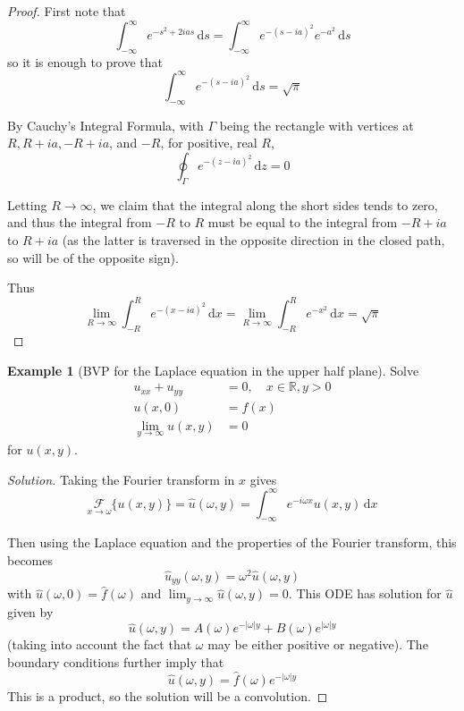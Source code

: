 \documentclass[10pt,fleqn]{article}
\newcommand{\diff}{\,\mathrm{d}}
\newcommand{\reals}{\mathbb{R}}
\theoremstyle{definition} \newtheorem{defn}{Definition}[section]
\theoremstyle{plain}      \newtheorem{thm}[defn]{Theorem}
\theoremstyle{plain}      \newtheorem{lem}[defn]{Lemma}
\theoremstyle{definition} \newtheorem{prop}[defn]{Proposition}
\theoremstyle{definition} \newtheorem{cor}[defn]{Corollary}
\theoremstyle{definition} \newtheorem{ex}[defn]{Example}
\theoremstyle{definition} \newtheorem{rem}[defn]{Remark}
\begin{document}
{\begin{proof}
    First note that
    \[
        \int_{-\infty}^{\infty}e^{-s^2+2ias}\diff s=
        \int_{-\infty}^{\infty}e^{-(s-ia)^2}e^{-a^2}\diff s
    \]
    so it is enough to prove that
    \[
        \int_{-\infty}^{\infty}e^{-(s-ia)^2}\diff s=
        \sqrt{\pi}
    \]

    By Cauchy's Integral Formula, with $\Gamma$ being the rectangle with vertices at $R,R+ia,-R+ia$, and $-R$, for positive, real $R$,
    \[
        \oint_{\Gamma}e^{-(z-ia)^2}\diff z=0
    \]

    Letting $R\to\infty$, we claim that the integral along the short sides tends to zero, and thus the integral from $-R$ to $R$ must be equal to the integral from $-R+ia$ to $R+ia$ (as the latter is traversed in the opposite direction in the closed path, so will be of the opposite sign).

    Thus
    \[
        \lim_{R\to\infty}\int_{-R}^R e^{-(x-ia)^2}\diff x=
        \lim_{R\to\infty}\int_{-R}^R e^{-x^2}\diff x=
        \sqrt{\pi}
    \]
\end{proof}

\begin{ex}[BVP for the Laplace equation in the upper half plane]
    Solve
    \begin{align*}
        u_{xx}+u_{yy}&=0,\quad x\in\reals,y>0\\
        u(x,0)&=f(x)\\
        \lim\limits_{y\to\infty}u(x,y)&=0
    \end{align*}
    for $u(x,y)$.
\end{ex}

\begin{proof}[Solution]
    Taking the Fourier transform in $x$ gives
    \[
        \underset{x\to\omega}{\mathcal{F}}\{u(x,y)\}=
        \hat{u}(\omega,y)=
        \int_{-\infty}^{\infty}e^{-i\omega x}u(x,y)\diff x
    \]

    Then using the Laplace equation and the properties of the Fourier transform, this becomes
    \[
        \hat{u}_{yy}(\omega,y)=
        \omega^2\hat{u}(\omega,y)
    \]
    with $\hat{u}(\omega,0)=\hat{f}(\omega)$ and $\lim_{y\to\infty}\hat{u}(\omega,y)=0$.
    This ODE has solution for $\hat{u}$ given by
    \[
        \hat{u}(\omega,y)=
        A(\omega)e^{-|\omega|y}+B(\omega)e^{|\omega|y}
    \]
    (taking into account the fact that $\omega$ may be either positive or negative).
    The boundary conditions further imply that
    \[
        \hat{u}(\omega,y)=
        \hat{f}(\omega)e^{-|\omega|y}
    \]
    This is a product, so the solution will be a convolution.


\end{proof}}
\end{document}
